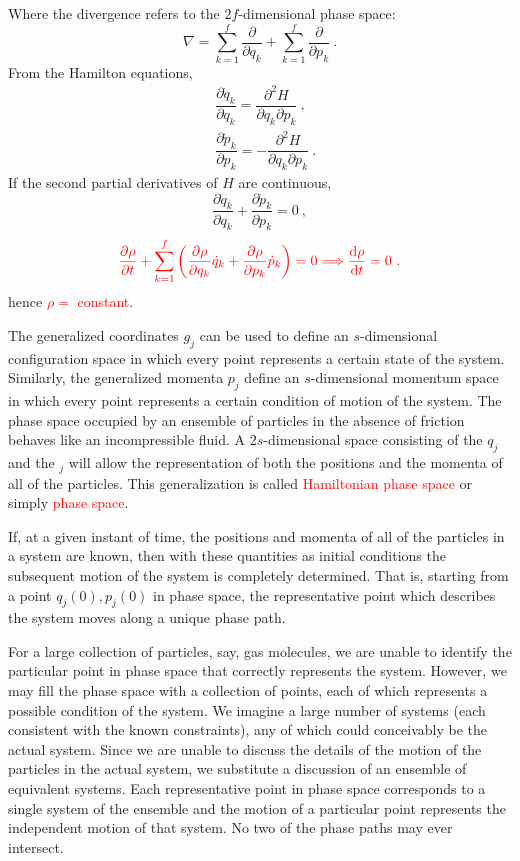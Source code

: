 \documentclass[11pt,a4paper]{article}
\newcommand{\dif}{\mathrm{d}}
\begin{document}
Where the divergence refers to the $2f$-dimensional phase space:
\begin{equation*}
\nabla = \sum_{k=1}^f \dfrac{\partial }{\partial q_k} + \sum_{k=1}^f \dfrac{\partial }{\partial p_k} ~.
\end{equation*}
From the Hamilton equations, 
\begin{align*}
& \dfrac{\partial \dot{q}_k}{\partial q_k} = \dfrac{\partial^2 H}{\partial q_k \partial p_k} ~, \\
& \dfrac{\partial \dot{p}_k}{\partial p_k} = -\dfrac{\partial^2 H}{\partial q_k \partial p_k} ~.
\end{align*}
If the second partial derivatives of $H$ are continuous, 
\begin{equation*}
\dfrac{\partial \dot{q}_k}{\partial q_k} +  \dfrac{\partial \dot{p}_k}{\partial p_k} = 0 ~,
\end{equation*}
\begin{align}
\color{red} \dfrac{\partial \rho}{ \partial t} + \sum_{k=1}^f \left(\dfrac{\partial \rho}{\partial q_k} \dot{q}_k +\dfrac{\partial \rho}{\partial p_k}\dot{p}_k \right) = 0  \Longrightarrow 
 \dfrac{\dif \rho}{\dif t} = 0 ~.
\end{align}
hence \textcolor{red}{$\rho =$ constant}.

\cite{marion1965classical, Thornton} The generalized coordinates $g_j$ can be used to define an $s$-dimensional configuration space in which every point represents a certain state of the system. Similarly, the generalized momenta $p_j$ define an $s$-dimensional momentum space in which every point represents a certain condition of motion of the system. The phase space occupied by an ensemble of particles in the absence of friction behaves like an incompressible fluid. A $2s$-dimensional space consisting of the $q_j$ and the $_j$ will allow the representation of both the positions and the momenta of all of the particles. This generalization is called \textcolor{red}{Hamiltonian phase space} or simply \textcolor{red}{phase space}. 

If, at a given instant of time, the positions and momenta of all of the particles in a system are known, then with these quantities as initial conditions the subsequent motion of the system is completely determined. That is, starting from a point $q_j(0), p_j(0)$ in phase space, the representative point which describes the system moves along a unique phase path.

For a large collection of particles, say, gas molecules, we are unable to identify the particular point in phase space that correctly represents the system. However, we may fill the phase space with a collection of points, each of which represents a possible condition of the system. We imagine a large number of systems (each consistent with the known constraints), any of which could conceivably be the actual system. Since we are unable to discuss the details of the motion of the particles in the actual system, we substitute a discussion of an ensemble of equivalent systems. Each representative point in phase space corresponds to a single system of the ensemble and the motion of a particular point represents the independent motion of that system. No two of the phase paths may ever intersect. 
\end{document}
